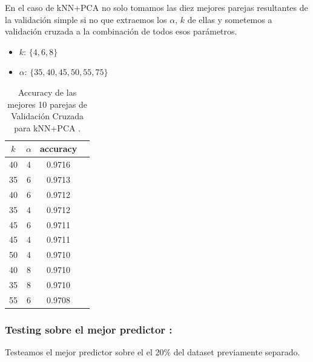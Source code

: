 En el caso de kNN+PCA  no solo tomamos las diez mejores parejas resultantes de la validación simple si no que extraemos los $\alpha$, $k$ de ellas y sometemos a validación cruzada a la combinación de todos esos parámetros.

\begin{itemize}
    \item \textbf{$k$}: $ \{4,6,8\}$
    \item \textbf{$\alpha$}: $\{  35, 40, 45, 50, 55, 75 \}$
\end{itemize}

\begin{table}[h!]
    \begin{center}
        \begin{tabular}{|c|c|c|c|}
        \hline
        \textbf{$k$} & \textbf{$\alpha$} & \textbf{accuracy} \\
        \hline
        40 & 4 & 0.9716\\
        35 & 6 & 0.9713\\
        40 & 6 & 0.9712\\
        35 & 4 & 0.9712\\
        45 & 6 & 0.9711\\
        45 & 4 & 0.9711\\
        50 & 4 & 0.9710\\
        40 & 8 & 0.9710\\
        35 & 8 & 0.9710\\
        55 & 6 & 0.9708\\
        
        \hline
        \end{tabular}
        \caption{Accuracy de las mejores 10 parejas de Validación Cruzada para kNN+PCA .}
        \label{knnpca_crossVal_table}

    \end{center}
\end{table}

\subsubsection{ Testing sobre el mejor predictor : }

Testeamos el mejor predictor sobre el el 20$\%$ del dataset previamente separado.
